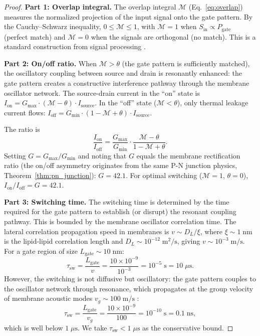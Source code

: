 \documentclass[twocolumn,10pt]{article}
\theoremstyle{remark}
\begin{document}
\begin{proof}
\textbf{Part 1: Overlap integral.}
The overlap integral $\mathcal{M}$ (Eq.~\ref{eq:overlap}) measures the normalized projection of the input signal onto the gate pattern. By the Cauchy--Schwarz inequality, $0 \leq \mathcal{M} \leq 1$, with $\mathcal{M} = 1$ when $S_{\mathrm{in}} \propto P_{\mathrm{gate}}$ (perfect match) and $\mathcal{M} = 0$ when the signals are orthogonal (no match). This is a standard construction from signal processing \cite{shannon1948}.

\textbf{Part 2: On/off ratio.}
When $\mathcal{M} > \theta$ (the gate pattern is sufficiently matched), the oscillatory coupling between source and drain is resonantly enhanced: the gate pattern creates a constructive interference pathway through the membrane oscillator network. The source-drain current in the ``on'' state is $I_{\mathrm{on}} = G_{\max} \cdot (\mathcal{M} - \theta) \cdot I_{\mathrm{source}}$. In the ``off'' state ($\mathcal{M} < \theta$), only thermal leakage current flows: $I_{\mathrm{off}} = G_{\min} \cdot (1 - \mathcal{M} + \theta) \cdot I_{\mathrm{source}}$.

The ratio is
\begin{equation}
\frac{I_{\mathrm{on}}}{I_{\mathrm{off}}} = \frac{G_{\max}}{G_{\min}} \cdot \frac{\mathcal{M} - \theta}{1 - \mathcal{M} + \theta}.
\end{equation}
Setting $G = G_{\max}/G_{\min}$ and noting that $G$ equals the membrane rectification ratio (the on/off asymmetry originates from the same P-N junction physics, Theorem~\ref{thm:pn_junction}): $G = 42.1$. For optimal switching ($\mathcal{M} = 1$, $\theta = 0$), $I_{\mathrm{on}}/I_{\mathrm{off}} = G = 42.1$.

\textbf{Part 3: Switching time.}
The switching time is determined by the time required for the gate pattern to establish (or disrupt) the resonant coupling pathway. This is bounded by the membrane oscillator correlation time. The lateral correlation propagation speed in membranes is $v \sim D_L / \xi$, where $\xi \sim 1\;\mathrm{nm}$ is the lipid-lipid correlation length \cite{lipowsky1995} and $D_L \sim 10^{-12}\;\mathrm{m}^2/\mathrm{s}$, giving $v \sim 10^{-3}\;\mathrm{m/s}$. For a gate region of size $L_{\mathrm{gate}} \sim 10\;\mathrm{nm}$:
\begin{equation}
\tau_{\mathrm{sw}} = \frac{L_{\mathrm{gate}}}{v} = \frac{10 \times 10^{-9}}{10^{-3}} = 10^{-5}\;\mathrm{s} = 10\;\mu\mathrm{s}.
\end{equation}
However, the switching is not diffusive but oscillatory: the gate pattern couples to the oscillator network through resonance, which propagates at the group velocity of membrane acoustic modes $v_g \sim 100\;\mathrm{m/s}$ \cite{lipowsky1995}:
\begin{equation}
\tau_{\mathrm{sw}} = \frac{L_{\mathrm{gate}}}{v_g} = \frac{10 \times 10^{-9}}{100} = 10^{-10}\;\mathrm{s} = 0.1\;\mathrm{ns},
\end{equation}
which is well below $1\;\mu\mathrm{s}$. We take $\tau_{\mathrm{sw}} < 1\;\mu\mathrm{s}$ as the conservative bound.


\end{proof}
\end{document}
